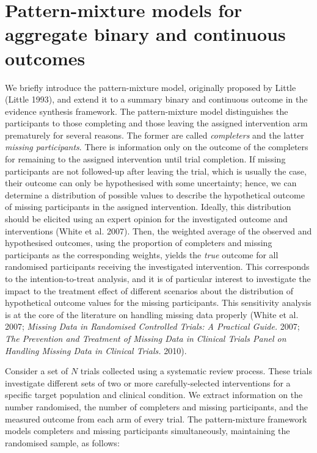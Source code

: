 \hypertarget{pattern-mixture-models-for-aggregate-binary-and-continuous-outcomes}{%
\section{Pattern-mixture models for aggregate binary and continuous outcomes}\label{pattern-mixture-models-for-aggregate-binary-and-continuous-outcomes}}

We briefly introduce the pattern-mixture model, originally proposed by Little
(Little 1993), and extend it to a summary binary and continuous outcome in the
evidence synthesis framework. The pattern-mixture model distinguishes the participants
to those completing and those leaving the assigned intervention arm prematurely
for several reasons. The former are called \emph{completers} and the latter
\emph{missing participants}. There is information only on the outcome of the completers
for remaining to the assigned intervention until trial completion. If missing
participants are not followed-up after leaving the trial, which is usually the case,
their outcome can only be hypothesised with some uncertainty; hence, we can determine
a distribution of possible values to describe the hypothetical outcome of missing
participants in the assigned intervention. Ideally, this distribution should be elicited
using an expert opinion for the investigated outcome and interventions (White et al. 2007).
Then, the weighted average of the observed and hypothesised outcomes, using the
proportion of completers and missing participants as the corresponding weights,
yields the \emph{true} outcome for all randomised participants receiving the investigated
intervention. This corresponds to the intention-to-treat analysis, and it is of
particular interest to investigate the impact to the treatment effect of different
scenarios about the distribution of hypothetical outcome values for the missing
participants. This sensitivity analysis is at the core of the literature on
handling missing data properly (White et al. 2007; \emph{Missing Data in Randomised Controlled Trials: A Practical Guide.} 2007; \emph{The Prevention and Treatment of Missing Data in Clinical Trials Panel on Handling Missing Data in Clinical Trials.} 2010).

Consider a set of \(N\) trials collected using a systematic review process. These
trials investigate different sets of two or more carefully-selected interventions
for a specific target population and clinical condition. We extract information on
the number randomised, the number of completers and missing participants, and the
measured outcome from each arm of every trial. The pattern-mixture framework models
completers and missing participants simultaneously, maintaining the randomised
sample, as follows:

